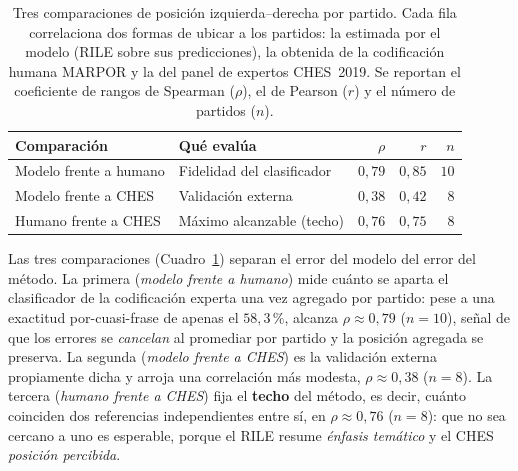 \begin{table}[H]
\centering
\caption{Tres comparaciones de posición izquierda--derecha por partido. Cada fila
correlaciona dos formas de ubicar a los partidos: la estimada por el modelo (RILE
sobre sus predicciones), la obtenida de la codificación humana MARPOR y la del
panel de expertos CHES~2019. Se reportan el coeficiente de rangos de Spearman
($\rho$), el de Pearson ($r$) y el número de partidos ($n$).}
\label{tab:val-ches}
\begin{tabular}{@{}l l r r r@{}}
\toprule
\textbf{Comparación} & \textbf{Qué evalúa} & \textbf{$\rho$} & \textbf{$r$} & \textbf{$n$} \\
\midrule
Modelo frente a humano & Fidelidad del clasificador & $0{,}79$ & $0{,}85$ & $10$ \\
Modelo frente a CHES & Validación externa & $0{,}38$ & $0{,}42$ & $8$ \\
Humano frente a CHES & Máximo alcanzable (techo) & $0{,}76$ & $0{,}75$ & $8$ \\
\bottomrule
\end{tabular}
\end{table}

Las tres comparaciones (Cuadro~\ref{tab:val-ches}) separan el error del modelo del
error del método. La primera (\emph{modelo frente a humano}) mide cuánto se
aparta el clasificador de la codificación experta una vez agregado por partido:
pese a una exactitud por-cuasi-frase de apenas el $58{,}3\,\%$, alcanza
$\rho \approx 0{,}79$ ($n=10$), señal de que los errores se \emph{cancelan} al
promediar por partido y la posición agregada se preserva. La segunda
(\emph{modelo frente a CHES}) es la validación externa propiamente dicha y arroja
una correlación más modesta, $\rho \approx 0{,}38$ ($n=8$). La tercera
(\emph{humano frente a CHES}) fija el \textbf{techo} del método, es decir, cuánto
coinciden dos referencias independientes entre sí, en $\rho \approx 0{,}76$
($n=8$): que no sea cercano a uno es esperable, porque el RILE resume
\emph{énfasis temático} y el CHES \emph{posición percibida}.

